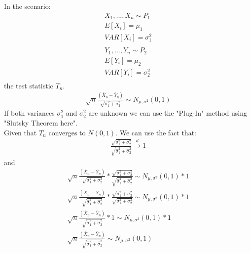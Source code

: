 \documentclass[10pt,a4paper]{book}
\begin{document}
	In the scenario:
	\begin{align}
		X_1,...,X_n \sim P_1\\
		E[X_i] = \mu_1\\
		VAR[X_i] = \sigma^2_1\\
		\\
		Y_1,...,Y_n \sim P_2\\
		E[Y_i] = \mu_2\\
		VAR[Y_i] = \sigma^2_2\\
	\end{align}	
	the test statistic $T_n$.
	\begin{align}
		\sqrt{n}\frac{(\overline{X}_n - \overline{Y}_n)}{\sqrt{\sigma^2_1+\sigma^2_2}} \sim N_{\mu,\sigma^2}(0,1)
	\end{align}
	If both variances $\sigma^2_1$ and $\sigma^2_2$ are unknown we can use the "Plug-In" method using "Slutsky Theorem here".\\
	Given that $T_n$ converges to $N(0,1)$. We can use the fact that:
	\begin{align}
		\frac{\sqrt{\sigma^2_1+\sigma^2_2}}{\sqrt{\hat{\sigma}^2_1+\hat{\sigma}^2_2}} \xrightarrow[]{d} 1
	\end{align}
	and 
	\begin{align}
	\sqrt{n}\frac{(\overline{X}_n - \overline{Y}_n)}{\sqrt{\sigma^2_1+\sigma^2_2}} * \frac{\sqrt{\sigma^2_1+\sigma^2_2}}{\sqrt{\hat{\sigma}^2_1+\hat{\sigma}^2_2}} \sim N_{\mu,\sigma^2}(0,1) * 1\\
	\sqrt{n}\frac{(\overline{X}_n - \overline{Y}_n)}{\sqrt{\hat{\sigma}^2_1+\hat{\sigma}^2_2}} * \frac{\sqrt{\sigma^2_1+\sigma^2_2}}{\sqrt{\sigma^2_1+\sigma^2_2}} \sim N_{\mu,\sigma^2}(0,1) * 1\\
	\sqrt{n}\frac{(\overline{X}_n - \overline{Y}_n)}{\sqrt{\hat{\sigma}^2_1+\hat{\sigma}^2_2}} * 1 \sim N_{\mu,\sigma^2}(0,1) * 1\\
	\sqrt{n}\frac{(\overline{X}_n - \overline{Y}_n)}{\sqrt{\hat{\sigma}^2_1+\hat{\sigma}^2_2}} \sim N_{\mu,\sigma^2}(0,1)
	\end{align}
\end{document}
